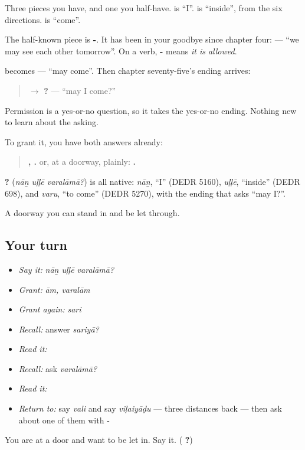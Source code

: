 Three pieces you have, and one you half-have.  is \textquotedblleft{}I\textquotedblright{}.  is \textquotedblleft{}inside\textquotedblright{}, from the six directions.  is \textquotedblleft{}come\textquotedblright{}.

The half-known piece is \textbf{-}. It has been in your goodbye since chapter four: \textbf{ } — \textquotedblleft{}we may see each other tomorrow\textquotedblright{}. On a verb, \textbf{-} means \emph{it is allowed}.

 becomes \textbf{} — \textquotedblleft{}may come\textquotedblright{}. Then chapter seventy-five's ending arrives:

\begin{quote}
\textbf{} $\to$ \textbf{?} — \textquotedblleft{}may I come?\textquotedblright{}
\end{quote}

Permission is a yes-or-no question, so it takes the yes-or-no ending. Nothing new to learn about the asking.

To grant it, you have both answers already:

\begin{quote}
\textbf{, .} or, at a doorway, plainly: \textbf{.}
\end{quote}

\begin{cousinweb}
\textbf{  ?} (\emph{nāṉ uḷḷē varalāmā?}) is all native: \emph{nāṉ}, \textquotedblleft{}I\textquotedblright{} (DEDR 5160), \emph{uḷḷē}, \textquotedblleft{}inside\textquotedblright{} (DEDR 698), and \emph{varu}, \textquotedblleft{}to come\textquotedblright{} (DEDR 5270), with the ending that asks \textquotedblleft{}may I?\textquotedblright{}.
\end{cousinweb}

\begin{grammarlens}[title={What you've built}]
A doorway you can stand in and be let through.
\end{grammarlens}

\subsection*{Your turn}
\begin{itemize}
\raggedright
  \item \emph{Say it:} \emph{nāṉ uḷḷē varalāmā?}
  \item \emph{Grant:} \emph{ām, varalām}
  \item \emph{Grant again:} \emph{sari}
  \item \emph{Recall:} answer \emph{sariyā?}
  \item \emph{Read it:} \textbf{}
  \item \emph{Recall:} ask \emph{varalāmā?}
  \item \emph{Read it:} \textbf{}
  \item \emph{Return to:} say \emph{vali} and say \emph{viḷaiyāḍu} — three distances back — then ask about one of them with -
\end{itemize}

\begin{tcolorbox}[breakable,colback=teal!4,colframe=teal!35!black,title={Before you move on}]
You are at a door and want to be let in. Say it. (\textbf{  ?})
\end{tcolorbox}

